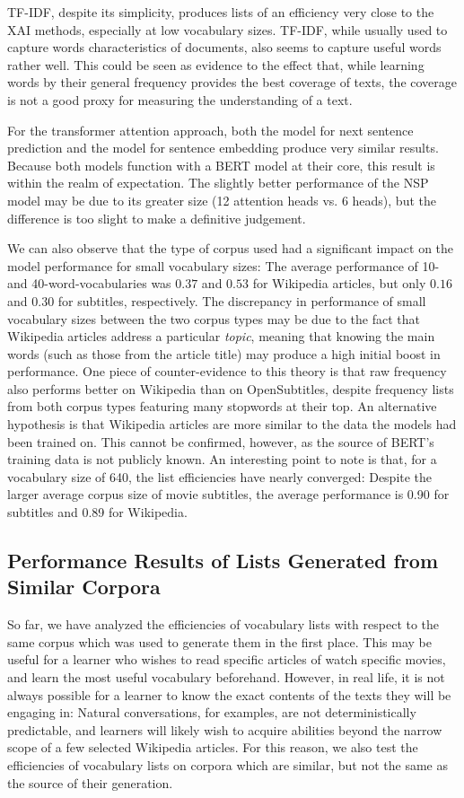 TF-IDF, despite its simplicity, produces lists of an efficiency very close to the XAI methods, especially at low vocabulary sizes.
TF-IDF, while usually used to capture words characteristics of documents, also seems to capture useful words rather well.
This could be seen as evidence to the effect that, while learning words by their general frequency provides the best coverage of texts, the coverage is not a good proxy for measuring the understanding of a text.


For the transformer attention approach, both the model for next sentence prediction and the model for sentence embedding produce very similar results.
Because both models function with a BERT model at their core, this result is within the realm of expectation.
The slightly better performance of the NSP model may be due to its greater size (12 attention heads vs. 6 heads), but the difference is too slight to make a definitive judgement.

We can also observe that the type of corpus used had a significant impact on the model performance for small vocabulary sizes:
The average performance of 10- and 40-word-vocabularies was $0.37$ and $0.53$ for Wikipedia articles, but only $0.16$ and $0.30$ for subtitles, respectively.
The discrepancy in performance of small vocabulary sizes between the two corpus types may be due to the fact that Wikipedia articles address a particular \textit{topic}, meaning that knowing the main words (such as those from the article title) may produce a high initial boost in performance.
One piece of counter-evidence to this theory is that raw frequency also performs better on Wikipedia than on OpenSubtitles, despite frequency lists from both corpus types featuring many stopwords at their top.
An alternative hypothesis is that Wikipedia articles are more similar to the data the models had been trained on.
This cannot be confirmed, however, as the source of BERT's training data is not publicly known.
An interesting point to note is that, for a vocabulary size of 640, the list efficiencies have nearly converged:
Despite the larger average corpus size of movie subtitles, the average performance is 0.90 for subtitles and 0.89 for Wikipedia.

\subsection{Performance Results of Lists Generated from Similar Corpora}
So far, we have analyzed the efficiencies of vocabulary lists with respect to the same corpus which was used to generate them in the first place.
This may be useful for a learner who wishes to read specific articles of watch specific movies, and learn the most useful vocabulary beforehand.
However, in real life, it is not always possible for a learner to know the exact contents of the texts they will be engaging in:
Natural conversations, for examples, are not deterministically predictable, and learners will likely wish to acquire abilities beyond the narrow scope of a few selected Wikipedia articles.
For this reason, we also test the efficiencies of vocabulary lists on corpora which are similar, but not the same as the source of their generation.

